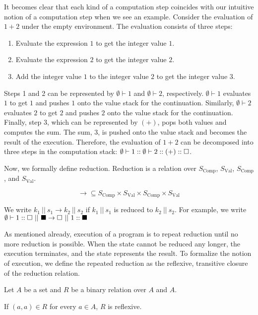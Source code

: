 It becomes clear that each kind of a computation step coincides with our intuitive
notion of a computation step when we see an example. Consider the evaluation of
$1+2$ under the empty environment. The evaluation consists of three steps:
\begin{enumerate}
  \item Evaluate the expression $1$ to get the integer value $1$.
  \item Evaluate the expression $2$ to get the integer value $2$.
  \item Add the integer value $1$ to the integer value $2$ to get the integer
    value $3$.
\end{enumerate}
Steps 1 and 2 can be represented by $\emptyset\vdash1$ and $\emptyset\vdash2$,
respectively. $\emptyset\vdash1$ evaluates $1$ to get $1$ and pushes $1$ onto the
value stack for the continuation. Similarly, $\emptyset\vdash2$ evaluates $2$ to
get $2$ and pushes $2$ onto the value stack for the continuation. Finally,
step 3, which can be represented by $(+)$, pops both values and computes the sum.
The sum, $3$, is pushed onto the value stack and becomes the result of the
execution. Therefore, the evaluation of $1+2$ can be decomposed into three steps
in the computation stack:
$\emptyset\vdash1:: \emptyset\vdash2:: (+):: \square$.

Now, we formally define reduction.
Reduction is a relation over $S_{\text{Comp}}$, $S_{\text{Val}}$,
$S_{\text{Comp}}$, and $S_{\text{Val}}$.

\[\rightarrow\subseteq S_{\text{Comp}}\times S_{\text{Val}}\times
S_{\text{Comp}} \times S_{\text{Val}}\]

We write $k_1\ ||\ s_1\rightarrow k_2\ ||\ s_2$ if $k_1\ ||\ s_1$ is reduced to
$k_2\ ||\ s_2$. For example, we write
$\evalk{\emptyset}{1}\mtk\ ||\ \mts\rightarrow \mtk\ ||\ \conss{1}\mts$

As mentioned already, execution of a program is to repeat reduction until no
more reduction is possible. When the state cannot be reduced any longer, the
execution terminates, and the state represents the result. To formalize the
notion of execution, we define the repeated reduction as the reflexive,
transitive closure of the reduction relation.

\begin{kaobox}[frametitle=Reflexive relations]
Let $A$ be a set and $R$ be a binary relation over $A$ and $A$.

If $(a,a)\in R$ for every $a\in A$, $R$ is reflexive.
\end{kaobox}

